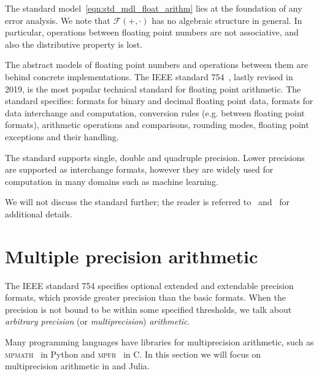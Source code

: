 The standard model~\eqref{eqn:std_mdl_float_arithm} lies at the foundation of any error analysis. We note that $\mathcal{F}(+,\cdot)$ has no algebraic structure in general. In particular, operations between floating point numbers are not associative, and also the distributive property is lost.

The abstract models of floating point numbers and operations between them are behind concrete implementations. The \textsc{IEEE} standard 754~\cite{article:IEEE754_2019}, lastly revised in 2019, is the most popular technical standard for floating point arithmetic. The standard specifies: formats for binary and decimal floating point data, formats for data interchange and computation, conversion rules (e.g. between floating point formats), arithmetic operations and comparisons, rounding modes, floating point exceptions and their handling.  

The standard supports single, double and quadruple precision. Lower precisions are supported as interchange formats, however they are widely used for computation in many domains such as machine learning.

We will not discuss the standard further; the reader is referred to~\cite[§~2.3]{higham:accuracy_book} and~\cite{article:IEEE754_2019} for additional details.


\section{Multiple precision arithmetic}
The \textsc{IEEE} standard 754 specifies optional extended and extendable precision formats, which provide greater precision than the basic formats. When the precision is not bound to be within some specified thresholds, we talk about \emph{arbitrary precision} (or \emph{multiprecision}) \emph{arithmetic}. 

Many programming languages have libraries for multiprecision arithmetic, such as \textsc{mpmath}~\cite{mpmath} in Python and \textsc{mpfr}~\cite{article:MPFR} in C. In this section we will focus on multiprecision arithmetic in \matlab and Julia.

